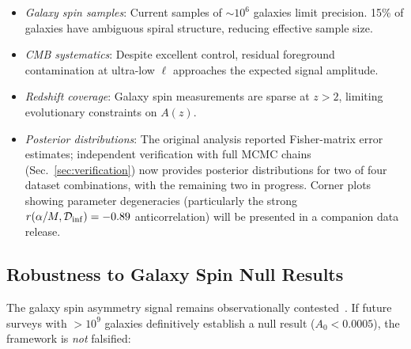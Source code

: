 \documentclass[aps,prd,twocolumn,superscriptaddress,showpacs,preprintnumbers,nofootinbib,longbibliography,floatfix]{revtex4-2}
\newcommand{\Dinf}{\mathcal{D}_{\rm inf}}
\begin{document}
\begin{itemize}[leftmargin=*]
\item \textit{Galaxy spin samples}: Current samples of $\sim 10^6$ galaxies limit precision. 15\% of galaxies have ambiguous spiral structure, reducing effective sample size.

\item \textit{CMB systematics}: Despite excellent control, residual foreground contamination at ultra-low $\ell$ approaches the expected signal amplitude.

\item \textit{Redshift coverage}: Galaxy spin measurements are sparse at $z > 2$, limiting evolutionary constraints on $A(z)$.

\item \textit{Posterior distributions}: The original analysis reported Fisher-matrix error estimates; independent verification with full MCMC chains (Sec.~\ref{sec:verification}) now provides posterior distributions for two of four dataset combinations, with the remaining two in progress. Corner plots showing parameter degeneracies (particularly the strong $r(\alpha/M,\Dinf)=-0.89$ anticorrelation) will be presented in a companion data release.
\end{itemize}

\subsection{Robustness to Galaxy Spin Null Results}\label{sec:spinnull}

The galaxy spin asymmetry signal remains observationally contested~\cite{PatelDesmond2024,Philcox2025}. If future surveys with $>10^9$ galaxies definitively establish a null result ($A_0 < 0.0005$), the framework is \textit{not} falsified:
\end{document}
